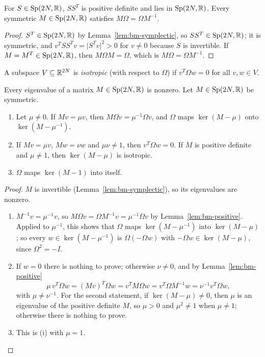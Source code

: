 \begin{vetdenv}
\begin{lemma}\label{lem:bm-positive}
For $S\in\mathrm{Sp}(2N,\mathbb R)$, $SS^T$ is positive definite and lies in $\mathrm{Sp}(2N,\mathbb R)$. Every symmetric $M\in\mathrm{Sp}(2N,\mathbb R)$ satisfies
$M\Omega=\Omega M^{-1}$.
\end{lemma}

\begin{proof}
$S^T\in\mathrm{Sp}(2N,\mathbb R)$ by Lemma~\ref{lem:bm-symplectic}, so $SS^T\in\mathrm{Sp}(2N,\mathbb R)$; it is symmetric, and $v^TSS^Tv=\lvert S^Tv\rvert^2>0$ for
$v\ne0$ because $S$ is invertible. If $M=M^T\in\mathrm{Sp}(2N,\mathbb R)$, then $M\Omega M=\Omega$, which is $M\Omega=\Omega M^{-1}$.
\end{proof}

A subspace $V\subseteq\mathbb R^{2N}$ is \emph{isotropic} (with respect to $\Omega$) if $v^T\Omega w=0$ for all $v,w\in V$.

\begin{lemma}\label{lem:bm-eigen}
Every eigenvalue of a matrix $M\in\mathrm{Sp}(2N,\mathbb R)$ is nonzero. Let $M\in\mathrm{Sp}(2N,\mathbb R)$ be symmetric.
\begin{enumerate}
\item[(i)] Let $\mu\ne0$. If $Mv=\mu v$, then $M\Omega v=\mu^{-1}\Omega v$, and $\Omega$ maps $\ker(M-\mu)$ onto
$\ker(M-\mu^{-1})$.
\item[(ii)] If $Mv=\mu v$, $Mw=\nu w$ and $\mu\nu\ne1$, then $v^T\Omega w=0$. If $M$ is positive definite and $\mu\ne1$,
then $\ker(M-\mu)$ is isotropic.
\item[(iii)] $\Omega$ maps $\ker(M-1)$ into itself.
\end{enumerate}
\end{lemma}

\begin{proof}
$M$ is invertible (Lemma~\ref{lem:bm-symplectic}), so its eigenvalues are nonzero.
\begin{enumerate}
\item[(i)] $M^{-1}v=\mu^{-1}v$, so $M\Omega v=\Omega M^{-1}v=\mu^{-1}\Omega v$ by Lemma~\ref{lem:bm-positive}. Applied to $\mu^{-1}$, this shows that $\Omega$ maps
$\ker(M-\mu^{-1})$ into $\ker(M-\mu)$; so every $w\in\ker(M-\mu^{-1})$ is $\Omega(-\Omega w)$ with $-\Omega w\in
\ker(M-\mu)$, since $\Omega^2=-I$.
\item[(ii)] If $w=0$ there is nothing to prove; otherwise $\nu\ne0$, and by Lemma~\ref{lem:bm-positive}
\[
 \mu\,v^T\Omega w=(Mv)^T\Omega w=v^TM\Omega w=v^T\Omega M^{-1}w=\nu^{-1}v^T\Omega w,
\]
with $\mu\ne\nu^{-1}$. For the second statement, if $\ker(M-\mu)\ne0$, then $\mu$ is an eigenvalue of the positive definite $M$, so $\mu>0$ and $\mu^2\ne1$ when $\mu\ne1$; otherwise there is nothing to prove.
\item[(iii)] This is (i) with $\mu=1$.\qedhere
\end{enumerate}
\end{proof}


\end{vetdenv}
